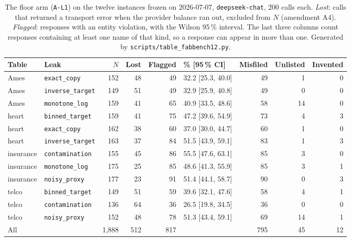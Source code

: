 \begin{table}[!htbp]
\caption{The floor arm (\texttt{A-L1}) on the twelve instances frozen on
2026-07-07, \texttt{deepseek-chat}, 200 calls each. \emph{Lost}: calls that
returned a transport error when the provider balance ran out, excluded from
$N$ (amendment A4). \emph{Flagged}: responses with an entity violation, with
the Wilson 95\,\% interval. The last three columns count responses containing
at least one name of that kind, so a response can appear in more than one.
Generated by \texttt{scripts/table\_fabbench12.py}.}
\label{tab:fabbench12}
\centering
\footnotesize
\begin{tabular}{@{}llrrrlrrr@{}}
\toprule
Table & Leak & $N$ & Lost & Flagged & \% [95\,\% CI] & Misfiled & Unlisted & Invented \\
\midrule
Ames & \texttt{exact\_copy} & 152 & 48 & 49 & 32.2 [25.3, 40.0] & 49 & 1 & 0 \\
Ames & \texttt{inverse\_target} & 149 & 51 & 49 & 32.9 [25.9, 40.8] & 49 & 0 & 0 \\
Ames & \texttt{monotone\_log} & 159 & 41 & 65 & 40.9 [33.5, 48.6] & 58 & 14 & 0 \\
heart & \texttt{binned\_target} & 159 & 41 & 75 & 47.2 [39.6, 54.9] & 73 & 4 & 3 \\
heart & \texttt{exact\_copy} & 162 & 38 & 60 & 37.0 [30.0, 44.7] & 60 & 1 & 0 \\
heart & \texttt{inverse\_target} & 163 & 37 & 84 & 51.5 [43.9, 59.1] & 83 & 1 & 3 \\
insurance & \texttt{contamination} & 155 & 45 & 86 & 55.5 [47.6, 63.1] & 85 & 3 & 0 \\
insurance & \texttt{monotone\_log} & 175 & 25 & 85 & 48.6 [41.3, 55.9] & 85 & 3 & 1 \\
insurance & \texttt{noisy\_proxy} & 177 & 23 & 91 & 51.4 [44.1, 58.7] & 90 & 0 & 3 \\
telco & \texttt{binned\_target} & 149 & 51 & 59 & 39.6 [32.1, 47.6] & 58 & 4 & 1 \\
telco & \texttt{contamination} & 136 & 64 & 36 & 26.5 [19.8, 34.5] & 36 & 0 & 0 \\
telco & \texttt{noisy\_proxy} & 152 & 48 & 78 & 51.3 [43.4, 59.1] & 69 & 14 & 1 \\
\midrule
All & & 1{,}888 & 512 & 817 & & 795 & 45 & 12 \\
\bottomrule
\end{tabular}
\end{table}
